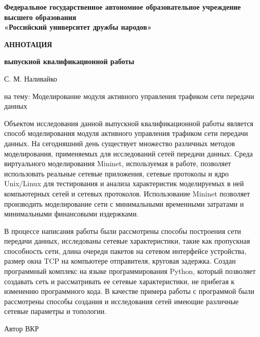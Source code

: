 \thispagestyle{empty}

  \begin{center}

    \textbf{Федеральное государственное автономное образовательное учреждение \\
высшего образования} \\
\textbf{«Российский университет дружбы народов»}

\hfill

\textbf{АННОТАЦИЯ}

\textbf{выпускной квалификационной работы }

\vspace{1cm}

С. М. Наливайко

\vspace{1cm}
на тему: Моделирование модуля активного управления трафиком сети передачи данных

\end{center}

\vspace{1cm}


Объектом исследования данной выпускной квалификационной работы
является способ моделирования модуля активного управления трафиком
сети передачи данных. На сегодняшний день существует множество
различных методов моделирования, применяемых для исследований сетей
передачи данных. Среда виртуального моделирования Mininet,
используемая в работе, позволяет использовать реальные сетевые
приложения, сетевые протоколы и ядро Unix/Linux для тестирования и
анализа характеристик моделируемых в ней компьютерных сетей и сетевых
протоколов. Использование Mininet позволяет производить моделирование
сети с минимальными временными затратами и минимальными финансовыми
издержками.

В процессе написания работы были рассмотрены способы построения сети
передачи данных, исследованы сетевые характеристики, такие как
пропускная способность сети, длина очереди пакетов на сетевом
интерфейсе устройства, размер окна TCP на компьютере отправителя,
круговая задержка. Создан программный комплекс на языке
программирования Python, который позволяет создавать сеть и
рассматривать ее сетевые характеристики, не прибегая к изменению
программного кода. В качестве примера работы с программой были
рассмотрены способы создания и исследования сетей имеющие различные
сетевые параметры и топологии.


\hfill

Автор ВКР \hspace{1cm} \underline{\hspace{3cm}} \hspace{1cm} \underline{\hspace{3cm}}
